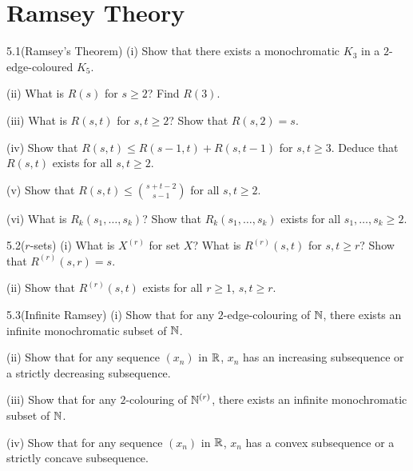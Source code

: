 \section{Ramsey Theory}
\begin{question}{5.1(Ramsey's Theorem)}
	(i) Show that there exists a monochromatic $K_3$ in a $2$-edge-coloured $K_5$.
	
	(ii) What is $R(s)$ for $s \geq 2$? Find $R(3)$.
	
	(iii) What is $R(s,t)$ for $s,t \geq 2$? Show that $R(s,2) = s$.
	
	(iv) Show that $R(s,t) \leq R(s-1,t) + R(s,t-1)$ for $s,t \geq 3$. Deduce that $R(s,t)$ exists for all $s,t \geq 2$.
	
	(v) Show that $R(s,t) \leq {s+t-2 \choose s-1}$ for all $s,t \geq 2$.
	
	(vi) What is $R_k(s_1,\dots,s_k)$? Show that $R_k(s_1,\dots,s_k)$ exists for all $s_1,\dots,s_k \geq 2$.
	
\end{question}

\begin{question} {5.2($r$-sets)}
	(i) What is $X^{(r)}$ for set $X$? What is $R^{(r)}(s,t)$ for $s,t \geq r$? Show that $R^{(r)}(s,r) = s$. 
	
	(ii) Show that $R^{(r)}(s,t)$ exists for all $r \geq 1$, $s,t \geq r$.
\end{question}

\begin{question}{5.3(Infinite Ramsey)}
	(i) Show that for any $2$-edge-colouring of $\mathbb{N}$, there exists an infinite monochromatic subset of $\mathbb{N}$.
	
	(ii) Show that for any sequence $(x_n)$ in $\mathbb{R}$, $x_n$ has an increasing subsequence or a strictly decreasing subsequence.
	
	(iii) Show that for any $2$-colouring of $\mathbb{N}^{(r)}$, there exists an infinite monochromatic subset of $\mathbb{N}$.
	
	(iv) Show that for any sequence $(x_n)$ in $\mathbb{R}$, $x_n$ has a convex subsequence or a strictly concave subsequence.
\end{question}
